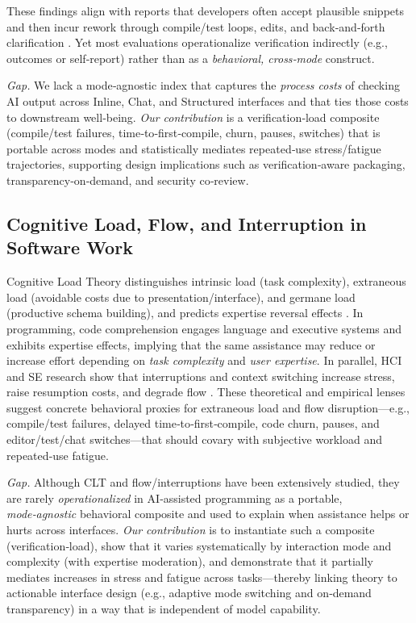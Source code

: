 \documentclass[sigconf]{acmart}
\begin{document}
These findings align with reports that developers often accept plausible snippets and then incur rework through compile/test loops, edits, and back‑and‑forth clarification \cite{vaithilingam2022expectation,barke2023groundedcopilot}. Yet most evaluations operationalize verification indirectly (e.g., outcomes or self‑report) rather than as a \emph{behavioral, cross‑mode} construct. 

\emph{Gap.} We lack a mode‑agnostic index that captures the \emph{process costs} of checking AI output across Inline, Chat, and Structured interfaces and that ties those costs to downstream well‑being. \emph{Our contribution} is a verification‑load composite (compile/test failures, time‑to‑first‑compile, churn, pauses, switches) that is portable across modes and statistically mediates repeated‑use stress/fatigue trajectories, supporting design implications such as verification‑aware packaging, transparency‑on‑demand, and security co‑review.

\subsection{Cognitive Load, Flow, and Interruption in Software Work}
Cognitive Load Theory distinguishes intrinsic load (task complexity), extraneous load (avoidable costs due to presentation/interface), and germane load (productive schema building), and predicts expertise reversal effects \cite{kalyuga2007expertise,paas2003cognitive,sweller2019cognitive,duran2022cognitive}. In programming, code comprehension engages language and executive systems and exhibits expertise effects, implying that the same assistance may reduce or increase effort depending on \emph{task complexity} and \emph{user expertise}. In parallel, HCI and SE research show that interruptions and context switching increase stress, raise resumption costs, and degrade flow \cite{mark2008cost,parnin2011resumption,meyer2019today,meyer2020detecting}. These theoretical and empirical lenses suggest concrete behavioral proxies for extraneous load and flow disruption—e.g., compile/test failures, delayed time‑to‑first‑compile, code churn, pauses, and editor/test/chat switches—that should covary with subjective workload and repeated‑use fatigue.

\emph{Gap.} Although CLT and flow/interruptions have been extensively studied, they are rarely \emph{operationalized} in AI‑assisted programming as a portable, \emph{mode‑agnostic} behavioral composite and used to explain when assistance helps or hurts across interfaces. \emph{Our contribution} is to instantiate such a composite (verification‑load), show that it varies systematically by interaction mode and complexity (with expertise moderation), and demonstrate that it partially mediates increases in stress and fatigue across tasks—thereby linking theory to actionable interface design (e.g., adaptive mode switching and on‑demand transparency) in a way that is independent of model capability.
\end{document}
